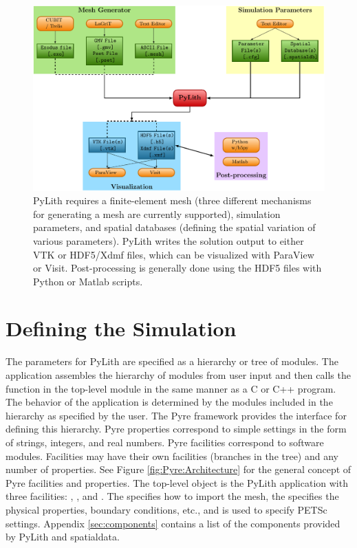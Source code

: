 \begin{figure}[htbp]
  \includegraphics[width=5in]{runpylith/figs/runpylith} 
  \caption{PyLith requires a finite-element mesh (three different
    mechanisms for generating a mesh are currently supported),
    simulation parameters, and spatial databases (defining the spatial
    variation of various parameters).  PyLith writes the solution
    output to either VTK or HDF5/Xdmf files, which can be visualized
    with ParaView or Visit. Post-processing is generally done using
    the HDF5 files with Python or Matlab scripts.}
\label{fig:pylith:workflow} 
\end{figure}


\section{Defining the Simulation}

The parameters for PyLith are specified as a hierarchy or tree of
modules. The application assembles the hierarchy of modules from user
input and then calls the  function in the top-level
module in the same manner as a C or C++ program. The behavior of the
application is determined by the modules included in the hierarchy as
specified by the user. The Pyre framework provides the interface for
defining this hierarchy. Pyre properties correspond to simple settings
in the form of strings, integers, and real numbers. Pyre facilities
correspond to software modules. Facilities may have their own
facilities (branches in the tree) and any number of properties. See
Figure \vref{fig:Pyre:Architecture} for the general concept of Pyre
facilities and properties. The top-level object is the PyLith
application with three facilities: , ,
and . The  specifies how to import the
mesh, the  specifies the physical properties, boundary
conditions, etc., and  is used to specify PETSc
settings. Appendix \vref{sec:components} contains a list of the
components provided by PyLith and spatialdata.


